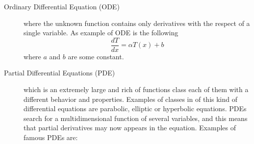 \begin{description}
\item[Ordinary Differential Equation (ODE)] where the unknown function contains only derivatives with the respect of a single variable. As example of ODE is the following
\[
  \frac{d T}{d x} = \alpha T(x) +b
\] where $a$ and $b$ are some constant.

\item [Partial Differential Equations (PDE)] which is an extremely large and rich of functions class each of them with a different behavior and properties. Examples of classes in of this kind of differential equations are parabolic, elliptic or hyperbolic equations. PDEs search for a multidimensional function of several variables, and this means that partial derivatives may now appears in the equation. 
Examples of famous PDEs are:
\end{description}
